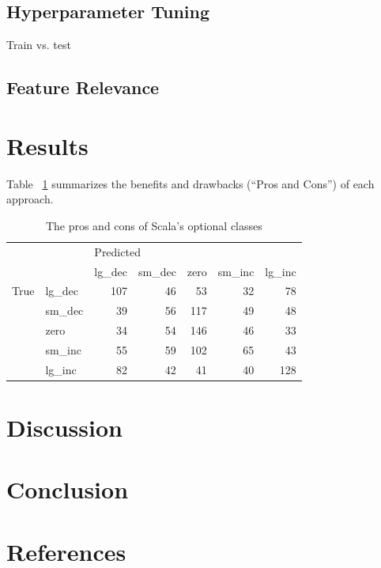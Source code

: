 \documentclass{article}
\begin{document}
	\subsection{Hyperparameter Tuning}
	
	Train vs. test
	
	\subsection{Feature Relevance}
	
	\section{Results}
	
	Table ~\ref{table:prosConsOptionalApproaches} summarizes
	the benefits and drawbacks (``Pros and Cons'') of each 
	approach.
	
	\begin{table}[h]
	\centering
	\caption{The pros and cons of Scala's optional classes}
	\label{table:prosConsOptionalApproaches}
	
	\begin{tabular}{llrrrrr}
		\toprule
		&        & \multicolumn{5}{l}{Predicted} \\
		&        &    lg\_dec & sm\_dec & zero & sm\_inc & lg\_inc \\
		\midrule
		True & lg\_dec &       107 &     46 &   53 &     32 &     78 \\
		& sm\_dec &        39 &     56 &  117 &     49 &     48 \\
		& zero &        34 &     54 &  146 &     46 &     33 \\
		& sm\_inc &        55 &     59 &  102 &     65 &     43 \\
		& lg\_inc &        82 &     42 &   41 &     40 &    128 \\
		\bottomrule
	\end{tabular}
	\end{table}%

	\section{Discussion}
	
	\section{Conclusion}
	
	\section{References}
	
\printbibliography
\end{document}
